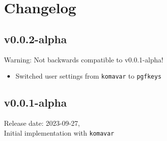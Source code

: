 \chapter{Changelog}
\section{v0.0.2-alpha}
Warning: Not backwards compatible to v0.0.1-alpha!
\begin{itemize}
	\item Switched user settings from \verb|komavar| to \verb|pgfkeys|
\end{itemize}

\section{v0.0.1-alpha}
	Release date: 2023-09-27,\\
	Initial implementation with \verb|komavar|